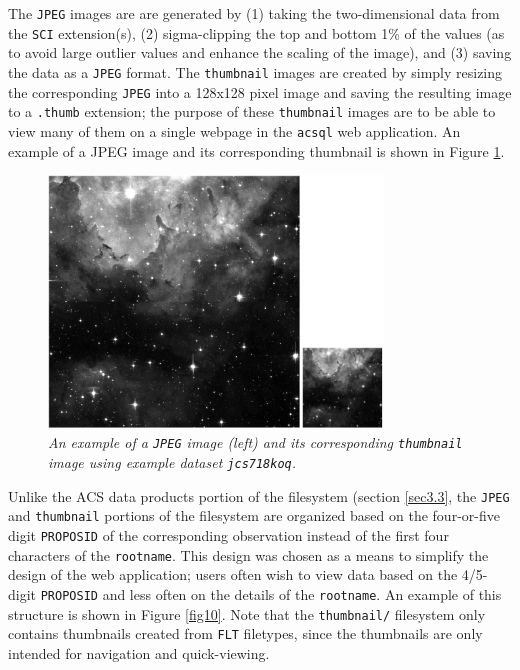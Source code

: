 \documentclass[10pt,journal,compsoc]{IEEEtran}
\begin{document}
The \texttt{JPEG} images are are generated by (1) taking the two-dimensional data from the \texttt{SCI} extension(s), (2) sigma-clipping the top and bottom 1\% of the values (as to avoid large
outlier values and enhance the scaling of the image), and (3) saving the data as a \texttt{JPEG} format.  The \texttt{thumbnail} images are created by simply resizing the corresponding
\texttt{JPEG} into a 128x128 pixel image and saving the resulting image to a \texttt{.thumb} extension; the purpose of these \texttt{thumbnail} images are to be able to view many of them on a
single webpage in the \texttt{acsql} web application.  An example of a JPEG image and its corresponding thumbnail is shown in Figure \ref{fig9}.

\begin{figure}[!h]
\centering
\includegraphics[width=3.5in]{./figures/jpeg_and_thumbnail.png}
\caption{\textit{An example of a \texttt{JPEG} image (left) and its corresponding \texttt{thumbnail} image using example dataset \texttt{jcs718koq}.}}
\label{fig9}
\end{figure}

Unlike the ACS data products portion of the filesystem (section \ref{sec3.3}, the \texttt{JPEG} and \texttt{thumbnail} portions of the filesystem are organized based on the
four-or-five digit \texttt{PROPOSID} of the corresponding observation instead of the first four characters of the \texttt{rootname}.  This design was chosen as a means to simplify the
design of the web application; users often wish to view data based on the 4/5-digit \texttt{PROPOSID} and less often on the details of the \texttt{rootname}.  An example of this
structure is shown in Figure \ref{fig10}.  Note that the \texttt{thumbnail/} filesystem only contains thumbnails created from \texttt{FLT} filetypes, since the thumbnails are only
intended for navigation and quick-viewing.
\end{document}
